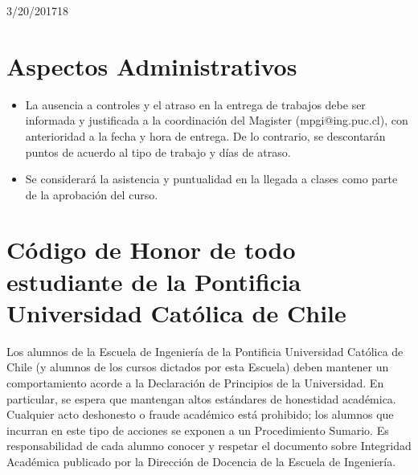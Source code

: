 \documentclass[11pt,letterpaper]{article}
\begin{document}
\begin{calendar}{3/20/2017}{18}
  \setlength{\calboxdepth}{.3in}

  \calday[Lunes]{\noclassday} %
  \calday[Martes]{\noclassday} %
  \calday[Miércoles]{\classday} %
  \calday[Jueves]{\noclassday} %
  \calday[Viernes]{\noclassday} %
  \skipday\skipday %








\end{calendar}

\section*{Aspectos Administrativos}
\begin{itemize}
  \item La ausencia a controles y el atraso en la entrega de trabajos debe ser informada y justificada a la coordinación del Magister (mpgi@ing.puc.cl), con anterioridad a la fecha y hora de entrega. De lo contrario, se descontarán puntos de acuerdo al tipo de trabajo y días de atraso.

  \item Se considerará la asistencia y puntualidad en la llegada a clases como parte de la aprobación del curso.
\end{itemize}

\section*{Código de Honor de todo estudiante de la Pontificia Universidad Católica de Chile}

Los alumnos de la Escuela de Ingeniería de la Pontificia Universidad
Católica de Chile (y alumnos de los cursos dictados por esta
Escuela) deben mantener un comportamiento acorde a la Declaración de
Principios de la Universidad. En particular, se espera que mantengan
altos estándares de honestidad académica.  Cualquier acto
deshonesto o fraude académico está prohibido; los alumnos que
incurran en este tipo de acciones se exponen a un Procedimiento
Sumario. Es responsabilidad de cada alumno conocer y respetar el
documento sobre Integridad Académica publicado por la Dirección de
Docencia de la Escuela de Ingeniería.
\end{document}
